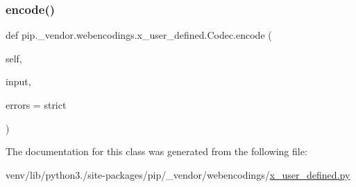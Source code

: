 \mbox{\label{classpip_1_1__vendor_1_1webencodings_1_1x__user__defined_1_1Codec_a308a5571cc1db0a4303c3a299e7eb423}} 
\subsubsection{\texorpdfstring{encode()}{encode()}}
{\footnotesize\ttfamily def pip.\+\_\+vendor.\+webencodings.\+x\+\_\+user\+\_\+defined.\+Codec.\+encode (\begin{DoxyParamCaption}\item[{}]{self,  }\item[{}]{input,  }\item[{}]{errors = {\ttfamily \textquotesingle{}strict\textquotesingle{}} }\end{DoxyParamCaption})}



The documentation for this class was generated from the following file\+:\begin{DoxyCompactItemize}
\item 
venv/lib/python3./site-\/packages/pip/\+\_\+vendor/webencodings/\hyperlink{x__user__defined_8py}{x\+\_\+user\+\_\+defined.\+py}\end{DoxyCompactItemize}
